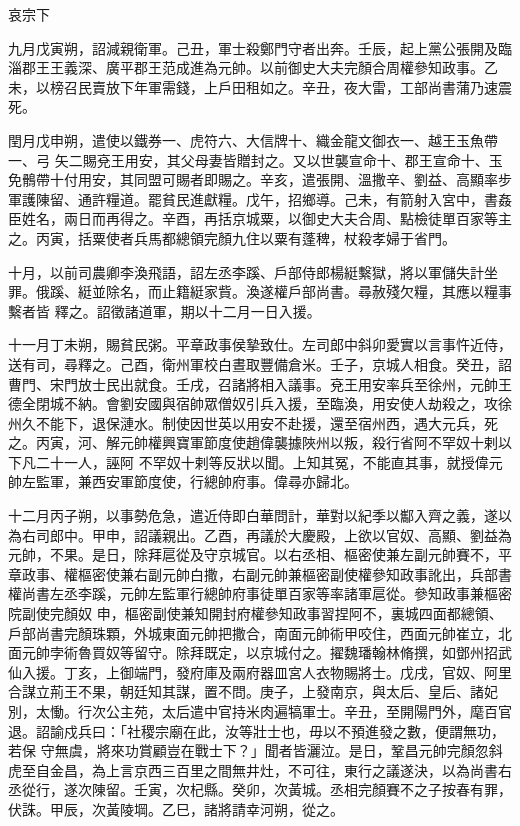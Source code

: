 
\begin{pinyinscope}

 哀宗下



 九月戊寅朔，詔減親衛軍。己丑，軍士殺鄭門守者出奔。壬辰，起上黨公張開及臨淄郡王王義深、廣平郡王范成進為元帥。以前御史大夫完顏合周權參知政事。乙未，以榜召民賣放下年軍需錢，上戶田租如之。辛丑，夜大雷，工部尚書蒲乃速震死。



 閏月戊申朔，遣使以鐵券一、虎符六、大信牌十、織金龍文御衣一、越王玉魚帶一、弓
 矢二賜兗王用安，其父母妻皆贈封之。又以世襲宣命十、郡王宣命十、玉免鶻帶十付用安，其同盟可賜者即賜之。辛亥，遣張開、溫撒辛、劉益、高顯率步軍護陳留、通許糧道。罷貧民進獻糧。戊午，招鄉導。己未，有箭射入宮中，書姦臣姓名，兩日而再得之。辛酉，再括京城粟，以御史大夫合周、點檢徒單百家等主之。丙寅，括粟使者兵馬都總領完顏九住以粟有蓬稗，杖殺孝婦于省門。



 十月，以前司農卿李渙飛語，詔左丞李蹊、戶部侍郎楊綎繫獄，將以軍儲失計坐罪。俄蹊、綎並除名，而止籍綎家貲。渙遂權戶部尚書。尋赦殘欠糧，其應以糧事繫者皆
 釋之。詔徵諸道軍，期以十二月一日入援。



 十一月丁未朔，賜貧民粥。平章政事侯摯致仕。左司郎中斜卯愛實以言事忤近侍，送有司，尋釋之。己酉，衛州軍校白晝取豐備倉米。壬子，京城人相食。癸丑，詔曹門、宋門放士民出就食。壬戌，召諸將相入議事。兗王用安率兵至徐州，元帥王德全閉城不納。會劉安國與宿帥眾僧奴引兵入援，至臨渙，用安使人劫殺之，攻徐州久不能下，退保漣水。制使因世英以用安不赴援，還至宿州西，遇大元兵，死之。丙寅，河、解元帥權興寶軍節度使趙偉襲據陜州以叛，殺行省阿不罕奴十剌以下凡二十一人，誣阿
 不罕奴十剌等反狀以聞。上知其冤，不能直其事，就授偉元帥左監軍，兼西安軍節度使，行總帥府事。偉尋亦歸北。



 十二月丙子朔，以事勢危急，遣近侍即白華問計，華對以紀季以酅入齊之義，遂以為右司郎中。甲申，詔議親出。乙酉，再議於大慶殿，上欲以官奴、高顯、劉益為元帥，不果。是日，除拜扈從及守京城官。以右丞相、樞密使兼左副元帥賽不，平章政事、權樞密使兼右副元帥白撒，右副元帥兼樞密副使權參知政事訛出，兵部書權尚書左丞李蹊，元帥左監軍行總帥府事徒單百家等率諸軍扈從。參知政事兼樞密院副使完顏奴
 申，樞密副使兼知開封府權參知政事習捏阿不，裏城四面都總領、戶部尚書完顏珠顆，外城東面元帥把撒合，南面元帥術甲咬住，西面元帥崔立，北面元帥孛術魯買奴等留守。除拜既定，以京城付之。擢魏璠翰林脩撰，如鄧州招武仙入援。丁亥，上御端門，發府庫及兩府器皿宮人衣物賜將士。戊戌，官奴、阿里合謀立荊王不果，朝廷知其謀，置不問。庚子，上發南京，與太后、皇后、諸妃別，太慟。行次公主苑，太后遣中官持米肉遍犒軍士。辛丑，至開陽門外，麾百官退。詔諭戍兵曰：「社稷宗廟在此，汝等壯士也，毋以不預進發之數，便謂無功，若保
 守無虞，將來功賞顧豈在戰士下？」聞者皆灑泣。是日，鞏昌元帥完顏忽斜虎至自金昌，為上言京西三百里之間無井灶，不可往，東行之議遂決，以為尚書右丞從行，遂次陳留。壬寅，次杞縣。癸卯，次黃城。丞相完顏賽不之子按春有罪，伏誅。甲辰，次黃陵堈。乙巳，諸將請幸河朔，從之。




\end{pinyinscope}

